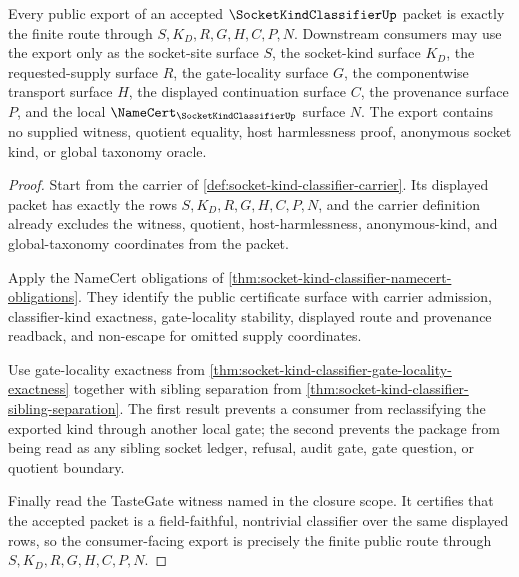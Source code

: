 \begin{theorem}
\label{thm:socket-kind-classifier-public-export-package}
Every public export of an accepted $\SocketKindClassifierUp$ packet is exactly the finite route through $S,K_D,R,G,H,C,P,N$. Downstream consumers may use the export only as the socket-site surface $S$, the socket-kind surface $K_D$, the requested-supply surface $R$, the gate-locality surface $G$, the componentwise transport surface $H$, the displayed continuation surface $C$, the provenance surface $P$, and the local $\NameCert_{\SocketKindClassifierUp}$ surface $N$. The export contains no supplied witness, quotient equality, host harmlessness proof, anonymous socket kind, or global taxonomy oracle.
\end{theorem}
\begin{proof}
Start from the carrier of \autoref{def:socket-kind-classifier-carrier}. Its displayed packet has exactly the rows $S,K_D,R,G,H,C,P,N$, and the carrier definition already excludes the witness, quotient, host-harmlessness, anonymous-kind, and global-taxonomy coordinates from the packet.

Apply the NameCert obligations of \autoref{thm:socket-kind-classifier-namecert-obligations}. They identify the public certificate surface with carrier admission, classifier-kind exactness, gate-locality stability, displayed route and provenance readback, and non-escape for omitted supply coordinates.

Use gate-locality exactness from \autoref{thm:socket-kind-classifier-gate-locality-exactness} together with sibling separation from \autoref{thm:socket-kind-classifier-sibling-separation}. The first result prevents a consumer from reclassifying the exported kind through another local gate; the second prevents the package from being read as any sibling socket ledger, refusal, audit gate, gate question, or quotient boundary.

Finally read the TasteGate witness named in the closure scope. It certifies that the accepted packet is a field-faithful, nontrivial classifier over the same displayed rows, so the consumer-facing export is precisely the finite public route through $S,K_D,R,G,H,C,P,N$.
\end{proof}



